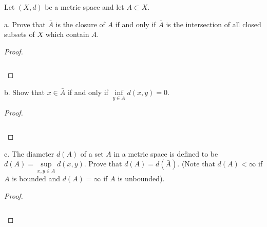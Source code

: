 Let $(X, d)$ be a metric space and let $A \subset X$.

a.  Prove that $\bar{A}$ is the closure of $A$ if and only if $\bar{A}$ is the intersection of all closed subsets of $X$
    which contain $A$.

\begin{proof}\renewcommand{\qedsymbol}{}\ \\\\
    \begin{align*}
    \end{align*}
\end{proof}

\pagebreak

b.  Show that $x \in \bar{A}$ if and only if $\inf\limits_{y \in A}{d(x, y)} = 0$.

\begin{proof}\renewcommand{\qedsymbol}{}\ \\\\
    \begin{align*}
    \end{align*}
\end{proof}

\pagebreak

c.  The diameter $d(A)$ of a set $A$ in a metric space is defined to be $d(A) = \sup\limits_{x,y \in A}{d(x, y)}$. Prove
    that $d(A) = d(\bar{A})$. (Note that $d(A) < \infty$ if $A$ is bounded and $d(A) = \infty$ if $A$ is unbounded).

\begin{proof}\renewcommand{\qedsymbol}{}\ \\\\
    \begin{align*}
    \end{align*}
\end{proof}

\pagebreak